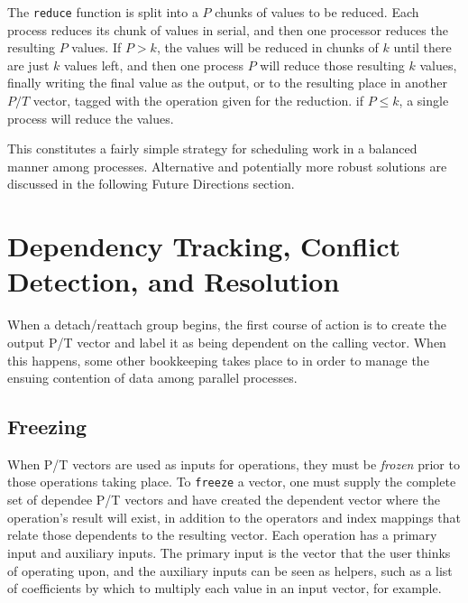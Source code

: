 The \texttt{reduce} function is split into a $P$ chunks of values to be reduced.
Each process reduces its chunk of values in serial, and then one processor
reduces the resulting $P$ values. If $P > k$, the values will be
reduced in chunks of $k$ until there are just $k$ values left, and then one
process $P$ will reduce those resulting $k$ values, finally writing the final
value as the output, or to the resulting place in another $P/T$ vector, tagged
with the operation given for the reduction. if $P \leq k$, a single process will
reduce the values.

This constitutes a fairly simple strategy for scheduling work in a balanced
manner among processes. Alternative and potentially more robust solutions are
discussed in the following Future Directions section.

\section{Dependency Tracking, Conflict Detection, and Resolution}
When a detach/reattach group begins, the first course of action is to create
the output P/T vector and label it as being dependent on the calling vector.
When this happens, some other bookkeeping takes place to in order to manage the
ensuing contention of data among parallel processes.

\subsection{Freezing}
When P/T vectors are used as inputs for operations, they must be \textit{frozen}
prior to those operations taking place. To \texttt{freeze} a vector, one must supply the
complete set of dependee P/T vectors and have created the dependent vector where the
operation's result will exist, in addition to the operators and index mappings
that relate those dependents to the resulting vector. Each operation has a
primary input and auxiliary inputs. The primary input is the vector that the
user thinks of operating upon, and the auxiliary inputs can be seen as helpers,
such as a list of coefficients by which to multiply each value in an input
vector, for example.

